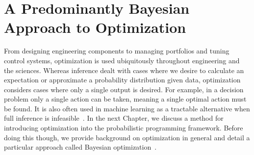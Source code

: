 
\chapter{A Predominantly Bayesian Approach to Optimization}
\label{chp:opt}

From designing engineering components to managing portfolios and tuning control systems,
optimization is used ubiquitously throughout engineering and the sciences.   Whereas inference
dealt with cases where we desire to calculate an expectation or approximate a probability distribution
given data, optimization considers cases where only a single output is desired.  For example, in
a decision problem only a single action can be taken, meaning a single optimal action must be
found.  It is also often used in machine learning as a tractable alternative when full inference
is infeasible~\citep{murphy2012machine}.  In the next Chapter, we discuss a method for introducing
optimization into the probabilistic programming framework.  Before doing this though, we provide
background on optimization in general and detail a particular approach called Bayesian
optimization~\cite{jones1998efficient,shahriari2016taking}.


%



